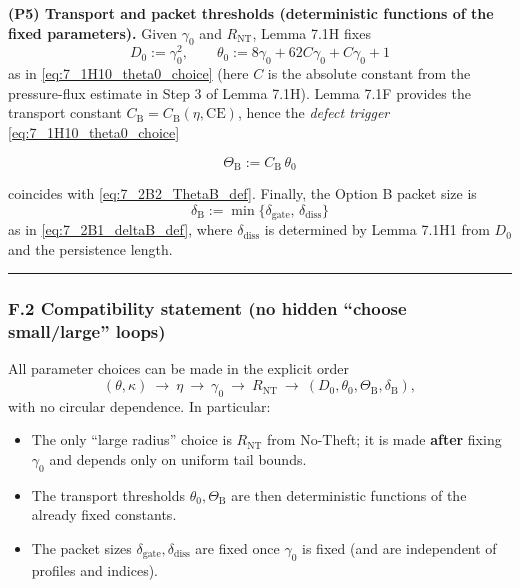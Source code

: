\documentclass[
  11pt,
]{article}
\providecommand{\tightlist}{%
  \setlength{\itemsep}{0pt}\setlength{\parskip}{0pt}}
\begin{document}
\textbf{(P5) Transport and packet thresholds (deterministic functions of the fixed parameters).} Given \(\gamma_0\) and \(R_{\mathrm{NT}}\), Lemma 7.1H fixes \[
D_0:=\gamma_0^2,
\qquad
\theta_0:= 8\gamma_0 + 62C\gamma_0 + C\gamma_0 + 1
\] as in \eqref{eq:7_1H10_theta0_choice} (here \(C\) is the absolute constant from the pressure-flux estimate in Step 3 of Lemma 7.1H). Lemma 7.1F provides the transport constant \(C_{\mathrm{B}}=C_{\mathrm{B}}(\eta,\mathrm{CE})\), hence the \emph{defect trigger} \eqref{eq:7_1H10_theta0_choice}

\begin{equation}
\Theta_{\mathrm{B}}:= C_{\mathrm{B}}\,\theta_0
\tag{7.2F1}\label{eq:7_2F1_ThetaB_registry}
\end{equation}

coincides with \eqref{eq:7_2B2_ThetaB_def}. Finally, the Option B packet size is \[
\delta_{\mathrm{B}}:=\min\{\delta_{\mathrm{gate}},\,\delta_{\mathrm{diss}}\}
\] as in \eqref{eq:7_2B1_deltaB_def}, where \(\delta_{\mathrm{diss}}\) is determined by Lemma 7.1H1 from \(D_0\) and the persistence length.

\begin{center}\rule{0.5\linewidth}{0.5pt}\end{center}

\hypertarget{f.2-compatibility-statement-no-hidden-choose-smalllarge-loops}{%
\subsubsection{F.2 Compatibility statement (no hidden ``choose small/large'' loops)}\label{f.2-compatibility-statement-no-hidden-choose-smalllarge-loops}}

All parameter choices can be made in the explicit order \[
(\theta,\kappa)\ \longrightarrow\ \eta\ \longrightarrow\ \gamma_0\ \longrightarrow\ R_{\mathrm{NT}}
\ \longrightarrow\ (D_0,\theta_0,\Theta_{\mathrm{B}},\delta_{\mathrm{B}}),
\] with no circular dependence. In particular:

\begin{itemize}
\tightlist
\item
  The only ``large radius'' choice is \(R_{\mathrm{NT}}\) from No-Theft; it is made \textbf{after} fixing \(\gamma_0\) and depends only on uniform tail bounds.
\item
  The transport thresholds \(\theta_0,\Theta_{\mathrm{B}}\) are then deterministic functions of the already fixed constants.
\item
  The packet sizes \(\delta_{\mathrm{gate}},\delta_{\mathrm{diss}}\) are fixed once \(\gamma_0\) is fixed (and are independent of profiles and indices).
\end{itemize}
\end{document}
